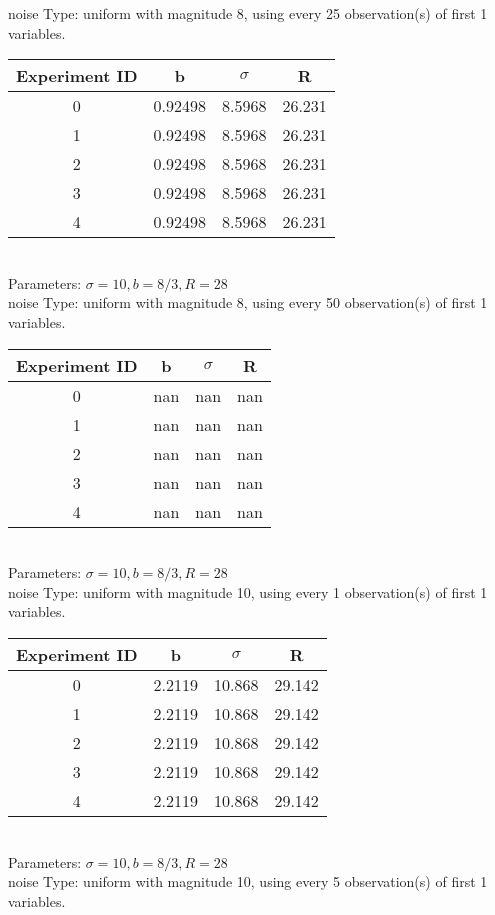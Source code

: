 \begin{multicols}{3}
noise Type: uniform with magnitude 8, using every 25 observation(s) of first 1 variables.\\
\begin{tabular}{cccc}
\hline Experiment ID & b & $\sigma$ & R \\ \hline 
0 & 0.92498 & 8.5968 & 26.231\\ \hline 
 1 & 0.92498 & 8.5968 & 26.231\\ \hline 
 2 & 0.92498 & 8.5968 & 26.231\\ \hline 
 3 & 0.92498 & 8.5968 & 26.231\\ \hline 
 4 & 0.92498 & 8.5968 & 26.231\\ \hline 
 \end{tabular}\\
Parameters: $\sigma=10, b=8/3, R=28$\\
noise Type: uniform with magnitude 8, using every 50 observation(s) of first 1 variables.\\
\begin{tabular}{cccc}
\hline Experiment ID & b & $\sigma$ & R \\ \hline 
0 & nan & nan & nan\\ \hline 
 1 & nan & nan & nan\\ \hline 
 2 & nan & nan & nan\\ \hline 
 3 & nan & nan & nan\\ \hline 
 4 & nan & nan & nan\\ \hline 
 \end{tabular}\\
Parameters: $\sigma=10, b=8/3, R=28$\\
noise Type: uniform with magnitude 10, using every 1 observation(s) of first 1 variables.\\
\begin{tabular}{cccc}
\hline Experiment ID & b & $\sigma$ & R \\ \hline 
0 & 2.2119 & 10.868 & 29.142\\ \hline 
 1 & 2.2119 & 10.868 & 29.142\\ \hline 
 2 & 2.2119 & 10.868 & 29.142\\ \hline 
 3 & 2.2119 & 10.868 & 29.142\\ \hline 
 4 & 2.2119 & 10.868 & 29.142\\ \hline 
 \end{tabular}\\
Parameters: $\sigma=10, b=8/3, R=28$\\
noise Type: uniform with magnitude 10, using every 5 observation(s) of first 1 variables.\\

\end{multicols}

